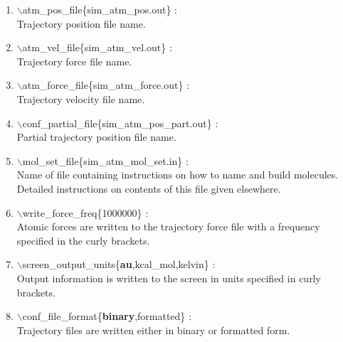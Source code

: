 \documentclass[12pt]{article}
\begin{document}
\begin{itemize}
\begin{enumerate}
 \vspace{0.15in}\Large
 \item   $\backslash$atm\_pos\_file\{sim\_atm\_pos.out\} : \\
   \large
     Trajectory position file name.

 \vspace{0.15in} \Large
 \item   $\backslash$atm\_vel\_file\{sim\_atm\_vel.out\} : \\
  \large Trajectory force file name.  

 \vspace{0.15in} \Large
 \item   $\backslash$atm\_force\_file\{sim\_atm\_force.out\} : \\
   \large
     Trajectory velocity file name.

 \vspace{0.15in}
 \Large
 \item   $\backslash$conf\_partial\_file\{sim\_atm\_pos\_part.out\} : \\
   \large
     Partial trajectory position file name.

 \vspace{0.15in} \Large
 \item   $\backslash$mol\_set\_file\{sim\_atm\_mol\_set.in\} : \\
   \large
    Name of file containing instructions on how to name and build molecules.
    Detailed instructions on contents of this file given elsewhere.

 \vspace{0.15in} \Large
 \item   $\backslash$write\_force\_freq\{1000000\} : \\
   \large
   Atomic forces are written to the trajectory force file with a
   frequency specified in the curly brackets.

 \vspace{0.15in} \Large
 \item   $\backslash$screen\_output\_units\{{\bf au},kcal\_mol,kelvin\} : \\
   \large
   Output information is written to the screen in units specified 
   in curly brackets.

 \vspace{0.15in} \Large
 \item   $\backslash$conf\_file\_format\{{\bf binary},formatted\} : \\
   \large
   Trajectory files are written either in binary or formatted form.


\end{enumerate}
\end{itemize}
\end{document}
